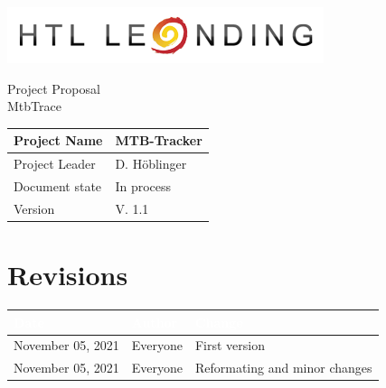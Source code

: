 \documentclass[12pt]{article}
\theoremstyle{definition}
\newcommand{\projectname}{MTB-Tracker}
\newcommand{\productname}{MtbTrace}
\newcommand{\projectleader}{D. Höblinger}
\newcommand{\documentstatus}{In process}
\newcommand{\version}{V. 1.1}
\begin{document}
\begin{titlepage}
\begin{flushright}
\includegraphics[scale=.5]{htlleondinglogo.png}\\
\end{flushright}

\vspace{10em}

\begin{center}
{\Huge Project Proposal} \\[3em]
{\LARGE \productname} \\[3em]
\end{center}

\begin{flushleft}
\begin{tabular}{|l|l|}
\hline
Project Name & \projectname \\ \hline
Project Leader & \projectleader \\ \hline
Document state & \documentstatus \\ \hline
Version & \version \\ \hline
\end{tabular}
\end{flushleft}

\end{titlepage}
\section*{Revisions}
\begin{tabular}{|l|l|l|}
\hline
\cellcolor[gray]{0.5}\textcolor{white}{Date} & \cellcolor[gray]{0.5}\textcolor{white}{Author} & \cellcolor[gray]{0.5}\textcolor{white}{Change} \\ \hline
November 05, 2021&Everyone&First version \\ \hline
November 05, 2021&Everyone&Reformating and minor changes \\ \hline
\end{tabular}
\pagebreak

\tableofcontents
\pagebreak
\end{document}
